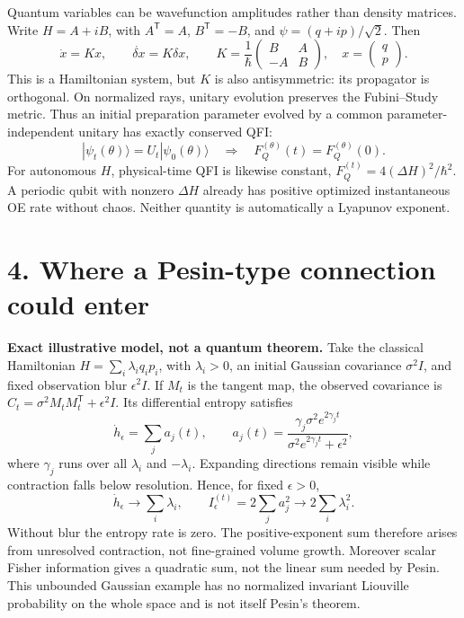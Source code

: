 \documentclass[11pt,a4paper]{article}
\begin{document}
Quantum variables can be wavefunction amplitudes rather than density matrices. Write $H=A+iB$, with $A^{\mathsf T}=A$, $B^{\mathsf T}=-B$, and $\psi=(q+ip)/\sqrt2$. Then
\[\dot x=Kx,\qquad\dot{\delta x}=K\delta x,\qquad K=\frac1\hbar\begin{pmatrix}B&A\\-A&B\end{pmatrix},\quad x=\begin{pmatrix}q\\p\end{pmatrix}.\]
This is a Hamiltonian system, but $K$ is also antisymmetric: its propagator is orthogonal. On normalized rays, unitary evolution preserves the Fubini--Study metric. Thus an initial preparation parameter evolved by a common parameter-independent unitary has exactly conserved QFI:
\[|\psi_t(\theta)\rangle=U_t|\psi_0(\theta)\rangle\quad\Longrightarrow\quad F_Q^{(\theta)}(t)=F_Q^{(\theta)}(0).\]
For autonomous $H$, physical-time QFI is likewise constant, $F_Q^{(t)}=4(\Delta H)^2/\hbar^2$. A periodic qubit with nonzero $\Delta H$ already has positive optimized instantaneous OE rate without chaos. Neither quantity is automatically a Lyapunov exponent.

\section*{4. Where a Pesin-type connection could enter}
\textbf{Exact illustrative model, not a quantum theorem.} Take the classical Hamiltonian $H=\sum_i\lambda_iq_ip_i$, with $\lambda_i>0$, an initial Gaussian covariance $\sigma^2I$, and fixed observation blur $\epsilon^2I$. If $M_t$ is the tangent map, the observed covariance is $C_t=\sigma^2M_tM_t^{\mathsf T}+\epsilon^2I$. Its differential entropy satisfies
\[\dot h_\epsilon=\sum_j a_j(t),\qquad a_j(t)=\frac{\gamma_j\sigma^2e^{2\gamma_jt}}{\sigma^2e^{2\gamma_jt}+\epsilon^2},\]
where $\gamma_j$ runs over all $\lambda_i$ and $-\lambda_i$. Expanding directions remain visible while contraction falls below resolution. Hence, for fixed $\epsilon>0$,
\[\dot h_\epsilon\longrightarrow\sum_i\lambda_i,\qquad I_\epsilon^{(t)}=2\sum_ja_j^2\longrightarrow2\sum_i\lambda_i^2.\]
Without blur the entropy rate is zero. The positive-exponent sum therefore arises from unresolved contraction, not fine-grained volume growth. Moreover scalar Fisher information gives a quadratic sum, not the linear sum needed by Pesin. This unbounded Gaussian example has no normalized invariant Liouville probability on the whole space and is not itself Pesin's theorem.
\end{document}
